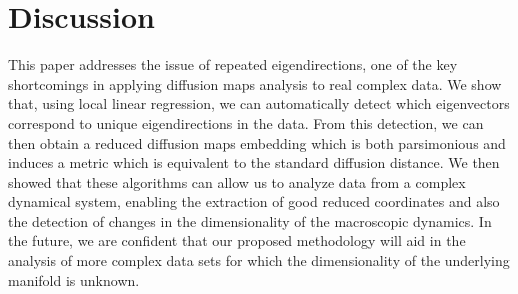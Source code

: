 \section{Discussion}

This paper addresses the issue of repeated eigendirections, one of the key shortcomings in applying diffusion maps analysis to real complex data.
%
We show that, using local linear regression, we can automatically detect which eigenvectors correspond to unique eigendirections in the data.
%
From this detection, we can then obtain a reduced diffusion maps embedding which is both parsimonious and induces a metric which is equivalent to the standard diffusion distance.
%
We then showed that these algorithms can allow us to analyze data from a complex dynamical system, enabling the extraction of good reduced coordinates and also the detection of changes in the dimensionality of the macroscopic dynamics.
%
In the future, we are confident that our proposed methodology will aid in the analysis of more complex data sets for which the dimensionality of the underlying manifold is unknown. 